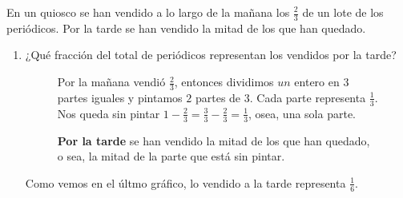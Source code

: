 \documentclass[12pt]{examdesign}
\theoremstyle{plain}
\theoremstyle{definition}
\theoremstyle{remark}
\begin{document}
	\begin{shortanswer}[title={Pensar cómo resolver las situaciones problemáticas aplicando fracciones...},
		rearrange=no,resetcounter=no]
		
	
	    \begin{question}
	    	En un quiosco se han vendido a lo largo de la mañana los $\displaystyle{\frac{2}{3}}$ de un lote de los periódicos. Por la tarde se han vendido la mitad de los que han quedado.
	    	
	    	\begin{enumerate}
	    		\item ¿Qué fracción del total de periódicos representan los vendidos por la tarde?
	    		
	    		\begin{figure}[H]
	    			\begin{minipage}[b]{0.3\textwidth}
	    				Por la mañana vendió $\frac{2}{3}$, entonces dividimos $un$ entero en $3$ partes iguales y pintamos $2$ partes de $3$. Cada parte representa $\frac{1}{3}$. Nos queda sin pintar $1-\frac{2}{3}=\frac{3}{3}-\frac{2}{3}=\frac{1}{3}$, osea, una sola parte.
	    				
	    				\textbf{Por la tarde} se han vendido la mitad de los que han quedado, o sea, la mitad de la parte que está sin pintar.
	    			\end{minipage}
	    			\hfill \begin{minipage}[b]{0.65\textwidth}
	    				\begin{figure}[H]
	    					\centering
	    				\end{figure}
	    			\end{minipage}
	    		\end{figure}
    		    \noindent Como vemos en el últmo gráfico, lo vendido a la tarde representa $\frac{1}{6}$.
    		     

\end{enumerate}
\end{question}
\end{shortanswer}
\end{document}
